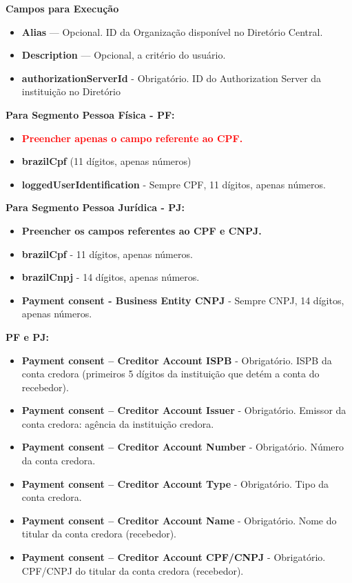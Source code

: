 \textbf{Campos para Execução}

\begin{itemize}
    \item \textbf{Alias} — Opcional. ID da Organização disponível no Diretório Central.
    \item \textbf{Description} — Opcional, a critério do usuário.
    \item \textbf{\textcolor{red!80}{authorizationServerId}} - Obrigatório. ID do Authorization Server da instituição no Diretório
\end{itemize}

\textbf{Para Segmento Pessoa Física - PF:}

\begin{itemize}
    \item \textbf{\textcolor{red}{Preencher apenas o campo referente ao CPF.}}
    \item \textbf{\textcolor{red!80}{brazilCpf}} (11 dígitos, apenas números)
    \item \textbf{\textcolor{red!80}{loggedUserIdentification}} - Sempre CPF, 11 dígitos, apenas números.
\end{itemize}

\textbf{Para Segmento Pessoa Jurídica - PJ:}
\begin{itemize}
    \item \textbf{\textcolor{red!80}{Preencher os campos referentes ao CPF e CNPJ.}}
    \item \textbf{\textcolor{red!80}{brazilCpf}} - 11 dígitos, apenas números.
    \item \textbf{\textcolor{red!80}{brazilCnpj}} - 14 dígitos, apenas números.
    \item \textbf{\textcolor{red!80}{Payment consent - Business Entity CNPJ}} - Sempre CNPJ, 14 dígitos, apenas números.
\end{itemize}

\textbf{PF e PJ:}
\begin{itemize}
    \item \textbf{\textcolor{red!80}{Payment consent – Creditor Account ISPB}} - Obrigatório. ISPB da conta credora (primeiros 5 dígitos da instituição que detém a conta do recebedor).
    \item \textbf{\textcolor{red!80}{Payment consent – Creditor Account Issuer}} - Obrigatório. Emissor da conta credora: agência da instituição credora.
    \item \textbf{\textcolor{red!80}{Payment consent – Creditor Account Number}} - Obrigatório. Número da conta credora.
    \item \textbf{\textcolor{red!80}{Payment consent – Creditor Account Type}} - Obrigatório. Tipo da conta credora.
    \item \textbf{\textcolor{red!80}{Payment consent – Creditor Account Name}} - Obrigatório. Nome do titular da conta credora (recebedor).
    \item \textbf{\textcolor{red!80}{Payment consent – Creditor Account CPF/CNPJ}} - Obrigatório. CPF/CNPJ do titular da conta credora (recebedor).
\end{itemize}

